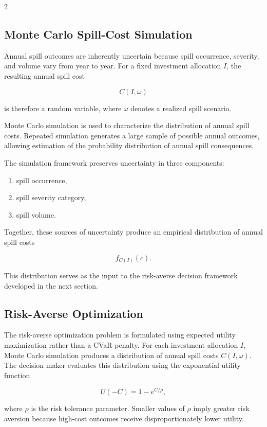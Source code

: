 \documentclass[10pt]{article}
\begin{document}
\begin{multicols}{2}
\subsection{Monte Carlo Spill-Cost Simulation}

Annual spill outcomes are inherently uncertain because spill
occurrence, severity, and volume vary from year to year. For a
fixed investment allocation $I$, the resulting annual spill cost

\[
C(I,\omega)
\]

is therefore a random variable, where $\omega$ denotes a realized
spill scenario.

Monte Carlo simulation is used to characterize the distribution of
annual spill costs. Repeated simulation generates a large sample of
possible annual outcomes, allowing estimation of the probability
distribution of annual spill consequences.

The simulation framework preserves uncertainty in three components:

\begin{enumerate}[leftmargin=*]
    \item spill occurrence,
    \item spill severity category,
    \item spill volume.
\end{enumerate}

Together, these sources of uncertainty produce an empirical
distribution of annual spill costs

\[
f_{C(I)}(c).
\]

This distribution serves as the input to the risk-averse decision
framework developed in the next section.


\subsection{Risk-Averse Optimization}

The risk-averse optimization problem is formulated using expected utility
maximization rather than a CVaR penalty. For each investment allocation
$I$, Monte Carlo simulation produces a distribution of annual spill costs
$C(I,\omega)$. The decision maker evaluates this distribution using the
exponential utility function

\[
U(-C) = 1 - e^{C/\rho},
\]

where $\rho$ is the risk tolerance parameter. Smaller values of $\rho$
imply greater risk aversion because high-cost outcomes receive
disproportionately lower utility.


\end{multicols}
\end{document}
